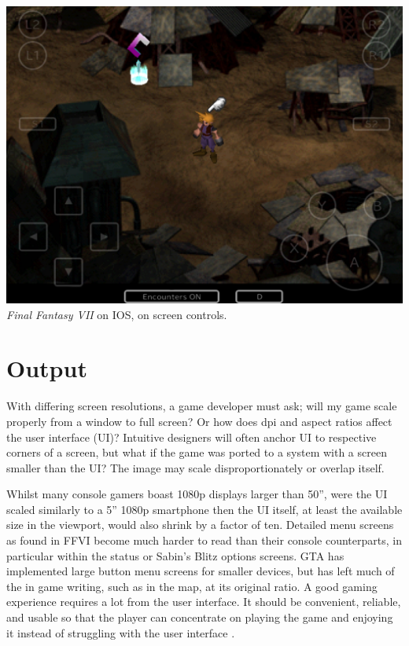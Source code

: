 \documentclass{scrartcl}
\begin{document}
{\includegraphics[scale = 0.18]{FF7_IOS_Controls}{
    \emph{Final Fantasy VII} on IOS, on screen controls.
}

\section*{Output}

With differing screen resolutions, a game developer must ask; will my game scale properly from a window to full screen? Or how does dpi and aspect ratios affect the user interface (UI)?  Intuitive designers will often anchor UI to respective corners of a screen, but what if the game was ported to a system with a screen smaller than the UI? The image may scale disproportionately or overlap itself.

Whilst many console gamers boast 1080p displays larger than 50'', were the UI scaled similarly to a 5'' 1080p smartphone then the UI itself, at least the available size in the viewport, would also shrink by a factor of ten. Detailed menu screens as found in FFVI become much harder to read than their console counterparts, in particular within the status or Sabin's Blitz options screens.  GTA has implemented large button menu screens for smaller devices, but has left much of the in game writing, such as in the map, at its original ratio.  A good gaming experience requires a lot from the user interface. It should be convenient, reliable, and usable so that the player can concentrate on playing the game and enjoying it instead of struggling with the user interface \cite {korhonen2006playability}.\\

}
\end{document}
